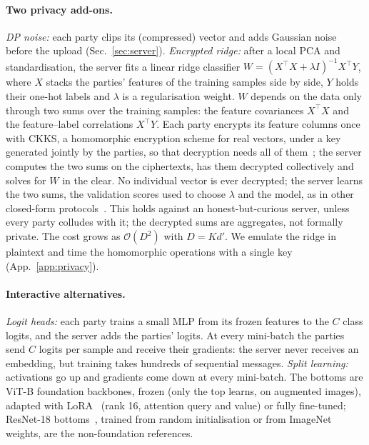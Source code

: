 \paragraph{Two privacy add-ons.}
\emph{DP noise:} each party clips its (compressed) vector and adds Gaussian noise before the upload (Sec.~\ref{sec:server}). \emph{Encrypted ridge:} after a local PCA and standardisation, the server fits a linear ridge classifier $W=(X^\top X+\lambda I)^{-1}X^\top Y$, where $X$ stacks the parties' features of the training samples side by side, $Y$ holds their one-hot labels and $\lambda$ is a regularisation weight. $W$ depends on the data only through two sums over the training samples: the feature covariances $X^\top X$ and the feature--label correlations $X^\top Y$. Each party encrypts its feature columns once with CKKS, a homomorphic encryption scheme for real vectors, under a key generated jointly by the parties, so that decryption needs all of them~\cite{mouchet2021multiparty}; the server computes the two sums on the ciphertexts, has them decrypted collectively and solves for $W$ in the clear. No individual vector is ever decrypted; the server learns the two sums, the validation scores used to choose $\lambda$ and the model, as in other closed-form protocols~\cite{gascon2017privacy,huang2026vafl}. This holds against an honest-but-curious server, unless every party colludes with it; the decrypted sums are aggregates, not formally private. The cost grows as $\mathcal{O}(D^2)$ with $D=Kd'$. We emulate the ridge in plaintext and time the homomorphic operations with a single key (App.~\ref{app:privacy}).

\paragraph{Interactive alternatives.}
\emph{Logit heads:} each party trains a small MLP from its frozen features to the $C$ class logits, and the server adds the parties' logits. At every mini-batch the parties send $C$ logits per sample and receive their gradients: the server never receives an embedding, but training takes hundreds of sequential messages. \emph{Split learning:} activations go up and gradients come down at every mini-batch. The bottoms are ViT-B foundation backbones, frozen (only the top learns, on augmented images), adapted with LoRA~\cite{hu2022lora} (rank 16, attention query and value) or fully fine-tuned; ResNet-18 bottoms~\cite{he2016resnet}, trained from random initialisation or from ImageNet weights, are the non-foundation references.


